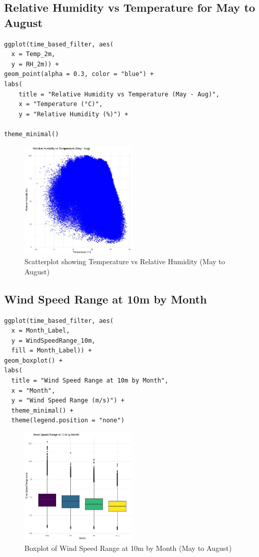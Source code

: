 \subsection*{Relative Humidity vs Temperature for May to August}

\begin{verbatim}
ggplot(time_based_filter, aes(
  x = Temp_2m, 
  y = RH_2m)) +
geom_point(alpha = 0.3, color = "blue") +
labs(
    title = "Relative Humidity vs Temperature (May - Aug)",
    x = "Temperature (°C)", 
    y = "Relative Humidity (%)") +
  
theme_minimal()
\end{verbatim}

\begin{figure}[h]
    \centering
    \includegraphics[width=0.5\textwidth]{figures/scatter_time.jpg}
    \caption{Scatterplot showing Temperature vs Relative Humidity (May to August)}
\end{figure}

\subsection*{Wind Speed Range at 10m by Month}

\begin{verbatim}
ggplot(time_based_filter, aes(
  x = Month_Label, 
  y = WindSpeedRange_10m, 
  fill = Month_Label)) +
geom_boxplot() +
labs(
  title = "Wind Speed Range at 10m by Month",
  x = "Month", 
  y = "Wind Speed Range (m/s)") +
  theme_minimal() +
  theme(legend.position = "none")
\end{verbatim}

\begin{figure}[h]
    \centering
    \includegraphics[width=0.5\textwidth]{figures/box_time.jpg}
    \caption{Boxplot of Wind Speed Range at 10m by Month (May to August)}
\end{figure}

